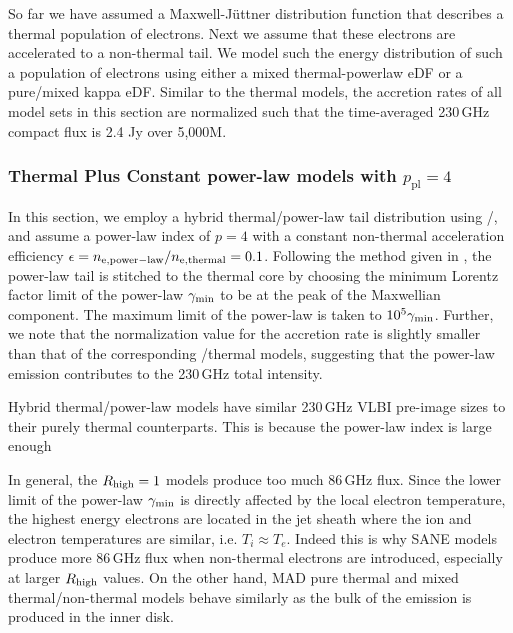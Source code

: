 So far we have assumed a Maxwell-J{\"u}ttner distribution function that describes a thermal population of electrons. Next we assume that these electrons are accelerated to a non-thermal tail. We model such the energy distribution of such a population of electrons using either a mixed thermal-powerlaw eDF or a pure/mixed kappa eDF. Similar to the thermal models, the accretion rates of all model sets in this section are normalized such that the time-averaged 230\,GHz compact flux is 2.4 Jy over 5,000M. 

\subsubsection{Thermal Plus Constant power-law models with $p_\mathrm{pl} = 4$}

In this section, we employ a hybrid thermal/power-law tail distribution using \hamr/\bhoss, and assume a power-law index of $p=4$ with a constant non-thermal acceleration efficiency $\epsilon=n_{\rm e, power-law}/n_{\rm e, thermal}=0.1$. Following the method given in \citet{Chatterjee2021}, the power-law tail is stitched to the thermal core by choosing the minimum Lorentz factor limit of the power-law $\gamma_{\rm min}$ to be at the peak of the Maxwellian component. The maximum limit of the power-law is taken to $10^5 \gamma_{\rm min}$. Further, we note that the normalization value for the accretion rate is slightly smaller than that of the corresponding \hamr/\bhoss thermal models, suggesting that the power-law emission contributes to the 230\,GHz total intensity.


Hybrid thermal/power-law models have similar 230\,GHz VLBI pre-image sizes to their purely thermal counterparts. This is because the power-law index is large enough 


In general, the $R_{\rm high}=1$ models produce too much 86\,GHz flux. Since the lower limit of the power-law $\gamma_{\rm min}$ is directly affected by the local electron temperature, the highest energy electrons are located in the jet sheath where the ion and electron temperatures are similar, i.e. $T_i\approx T_e$. Indeed this is why SANE models produce more 86\,GHz flux when non-thermal electrons are introduced, especially at larger $R_{\rm high}$ values. On the other hand, MAD pure thermal and mixed thermal/non-thermal models behave similarly as the bulk of the emission is produced in the inner disk.

